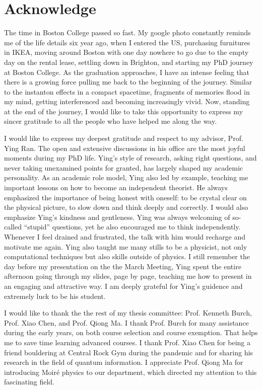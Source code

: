 \chapter*{Acknowledge}
The time in Boston College passed so fast. My google photo constantly reminds me of the life details six year ago, when I entered the US, purchasing furnitures in IKEA, moving around Boston with one day nowhere to go due to the empty day on the rental lease, settling down in Brighton, and starting my PhD journey at Boston College. As the graduation approaches, I have an intense feeling that there is a growing force pulling me back to the beginning of the journey. Similar to the instanton effects in a compact spacetime, fragments of memories flood in my mind, getting interferenced and becoming increasingly vivid. Now, standing at the end of the journey, I would like to take this opportunity to express my sincer gratitude to all the people who have helped me along the way.


I would like to express my deepest gratitude and respect to my advisor, Prof. Ying Ran. The open and extensive discussions in his office are the most joyful moments during my PhD life. Ying's style of research, asking right questions, and never taking unexamined points for granted, has largely shaped my academic personality. As an academic role model, Ying also led by example, teaching me important lessons on how to become an independent theorist. He always emphasized the importance of being honest with oneself: to be crystal clear on the physical picture, to slow down and think deeply and correctly. I would also emphasize Ying's kindness and gentleness. Ying was always welcoming of so-called ``stupid'' questions, yet he also encouraged me to think independently. Whenever I feel drained and frustrated, the talk with him would recharge and motivate me again. Ying also taught me many stills to be a physicist, not only computational techniques but also skills outside of physics. I still remember the day before my presentation on the the March Meeting, Ying spent the entire afternoon going through my slides, page by page, teaching me how to present in an engaging and attractive way. I am deeply grateful for Ying's guidence and extremely luck to be his student.


I would like to thank the the rest of my thesis committee: Prof. Kenneth Burch, Prof. Xiao Chen, and Prof. Qiong Ma. I thank Prof. Burch for many assistance during the early years, on both course selection and course exemption. That helps me to save time learning advanced courses. I thank Prof. Xiao Chen for being a friend bouldering at Central Rock Gym during the pandemic and for sharing his research in the field of quantum information. I appreciate Prof. Qiong Ma for introducing Moir\'e physics to our department, which directed my attention to this fascinating field.


